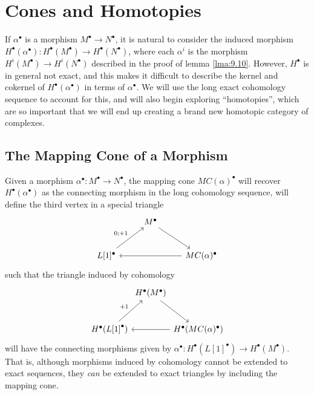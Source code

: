 \section{Cones and Homotopies}
If $\alpha ^{\bullet } $ is a morphism $M^\bullet \to N^\bullet $, it is natural to consider the induced morphism $H^\bullet (\alpha ^\bullet ): H^\bullet (M^\bullet ) \to H^\bullet (N^\bullet )$, where each $\alpha ^i$ is the morphism $H^i(M^\bullet )\to H^i(N^\bullet )$ described in the proof of lemma \ref{lma:9.10}. However, $H^\bullet $ is in general not exact, and this makes it difficult to describe the kernel and cokernel of $H^\bullet (\alpha ^\bullet )$ in terms of $\alpha ^\bullet $. We will use the long exact cohomology sequence to account for this, and will also begin exploring ``homotopies'', which are so important that we will end up creating a brand new homotopic category of complexes.

\subsection{The Mapping Cone of a Morphism}
Given a morphism $\alpha ^\bullet : M^\bullet  \to N^\bullet $, the mapping cone $MC(\alpha )^\bullet $ will recover $H^\bullet (\alpha ^\bullet )$ as the connecting morphism in the long cohomology sequence, will define the third vertex in a special triangle
\[\begin{tikzcd}[row sep = 2.5em, column sep = 2.5em]
	&M^\bullet \ar[dr]\\
	L[1]^\bullet \ar[ur, "0;+1"]&&MC(\alpha )^\bullet \ar[ll]
\end{tikzcd}\]
such that the triangle induced by cohomology
\[\begin{tikzcd}[row sep = 2.5em, column sep = 0em]
	&H^\bullet (M^\bullet )\ar[dr]\\
	H^\bullet (L\text{[}1\text{]} ^\bullet )\ar[ur, "+1"]&&H^\bullet (MC(\alpha )^\bullet) \ar[ll]
\end{tikzcd}\]
will have the connecting morphisms given by $\alpha ^\bullet : H^\bullet (L[1]^\bullet ) \to H^\bullet (M^\bullet )$. That is, although morphisms induced by cohomology cannot be extended to exact sequences, they \emph{can} be extended to exact triangles by including the mapping cone.

